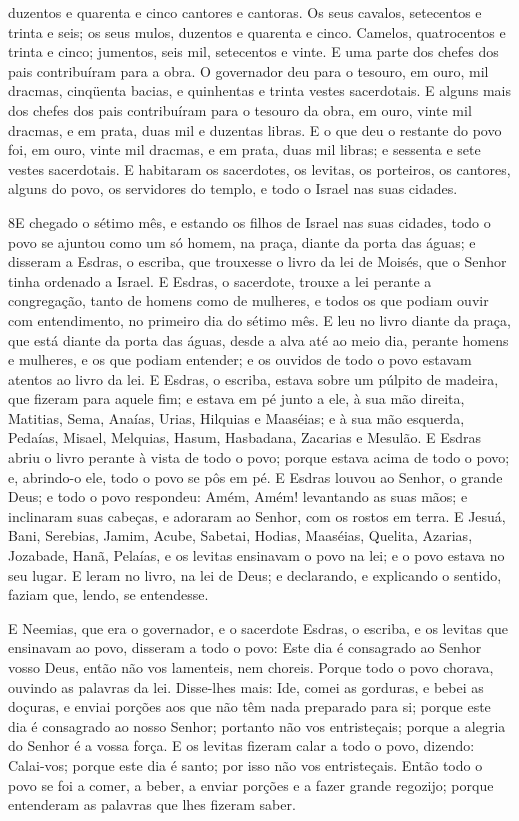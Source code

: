 duzentos e quarenta e cinco cantores e cantoras. Os seus
cavalos, setecentos e trinta e seis; os seus mulos, duzentos e
quarenta e cinco. Camelos, quatrocentos e trinta e cinco;
jumentos, seis mil, setecentos e vinte. E uma parte dos
chefes dos pais contribuíram para a obra. O governador deu para o
tesouro, em ouro, mil dracmas, cinqüenta bacias, e quinhentas e
trinta vestes sacerdotais. E alguns mais dos chefes dos pais
contribuíram para o tesouro da obra, em ouro, vinte mil dracmas, e
em prata, duas mil e duzentas libras. E o que deu o restante
do povo foi, em ouro, vinte mil dracmas, e em prata, duas mil
libras; e sessenta e sete vestes sacerdotais. E habitaram os
sacerdotes, os levitas, os porteiros, os cantores, alguns do povo,
os servidores do templo, e todo o Israel nas suas cidades.

\medskip

\lettrine{8} E chegado o sétimo mês, e estando os filhos de
Israel nas suas cidades, todo o povo se ajuntou como um só homem, na
praça, diante da porta das águas; e disseram a Esdras, o escriba,
que trouxesse o livro da lei de Moisés, que o Senhor tinha ordenado
a Israel. E Esdras, o sacerdote, trouxe a lei perante a
congregação, tanto de homens como de mulheres, e todos os que podiam
ouvir com entendimento, no primeiro dia do sétimo mês. E leu no
livro diante da praça, que está diante da porta das águas, desde a
alva até ao meio dia, perante homens e mulheres, e os que podiam
entender; e os ouvidos de todo o povo estavam atentos ao livro da
lei. E Esdras, o escriba, estava sobre um púlpito de madeira,
que fizeram para aquele fim; e estava em pé junto a ele, à sua mão
direita, Matitias, Sema, Anaías, Urias, Hilquias e Maaséias; e à sua
mão esquerda, Pedaías, Misael, Melquias, Hasum, Hasbadana, Zacarias
e Mesulão. E Esdras abriu o livro perante à vista de todo o
povo; porque estava acima de todo o povo; e, abrindo-o ele, todo o
povo se pôs em pé. E Esdras louvou ao Senhor, o grande Deus; e
todo o povo respondeu: Amém, Amém! levantando as suas mãos; e
inclinaram suas cabeças, e adoraram ao Senhor, com os rostos em
terra. E Jesuá, Bani, Serebias, Jamim, Acube, Sabetai, Hodias,
Maaséias, Quelita, Azarias, Jozabade, Hanã, Pelaías, e os levitas
ensinavam o povo na lei; e o povo estava no seu lugar. E leram
no livro, na lei de Deus; e declarando, e explicando o sentido,
faziam que, lendo, se entendesse.

E Neemias, que era o governador, e o sacerdote Esdras, o escriba,
e os levitas que ensinavam ao povo, disseram a todo o povo: Este dia
é consagrado ao Senhor vosso Deus, então não vos lamenteis, nem
choreis. Porque todo o povo chorava, ouvindo as palavras da lei.
Disse-lhes mais: Ide, comei as gorduras, e bebei as doçuras,
e enviai porções aos que não têm nada preparado para si; porque este
dia é consagrado ao nosso Senhor; portanto não vos entristeçais;
porque a alegria do Senhor é a vossa força. E os levitas
fizeram calar a todo o povo, dizendo: Calai-vos; porque este dia é
santo; por isso não vos entristeçais. Então todo o povo se
foi a comer, a beber, a enviar porções e a fazer grande regozijo;
porque entenderam as palavras que lhes fizeram saber.

